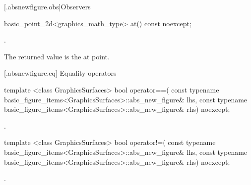  [\iotwod.absnewfigure.obs]{Observers}%

%
\begin{itemdecl}
basic_point_2d<graphics_math_type> at() const noexcept;
\end{itemdecl}
\begin{itemdescr}
\pnum
\returns {}.

\pnum
\remarks
The returned value is the at point.
\end{itemdescr}

 [\iotwod.absnewfigure.eq] {Equality operators}%

%
\begin{itemdecl}
template <class GraphicsSurfaces>
bool operator==(
  const typename basic_figure_items<GraphicsSurfaces>::abs_new_figure& lhs,
  const typename basic_figure_items<GraphicsSurfaces>::abs_new_figure& rhs) 
  noexcept;
\end{itemdecl}
\begin{itemdescr}
\pnum
\returns {}.
\end{itemdescr}

%
\begin{itemdecl}
template <class GraphicsSurfaces>
bool operator!=(
  const typename basic_figure_items<GraphicsSurfaces>::abs_new_figure& lhs,
  const typename basic_figure_items<GraphicsSurfaces>::abs_new_figure& rhs) 
  noexcept;
\end{itemdecl}
\begin{itemdescr}
\pnum
\returns {}.
\end{itemdescr}
